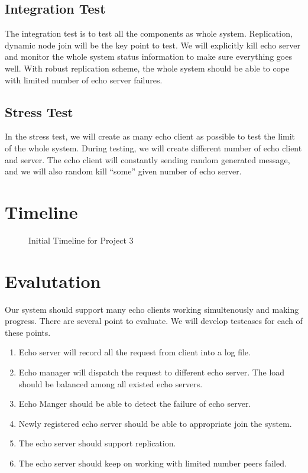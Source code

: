 \documentclass[12pt]{article}
\begin{document}
\subsection{Integration Test}
The integration test is to test all the components as whole system. Replication,
dynamic node join will be the key point to test. We will explicitly kill echo server
and monitor the whole system status information to make sure everything goes well.
With robust replication scheme, the whole system should be able to cope with limited
number of echo server failures.

\subsection{Stress Test}
In the stress test, we will create as many echo client as possible to test
the limit of the whole system. During testing, we will create different number 
of echo client and server. The echo client will constantly sending random 
generated message, and we will also random kill ``some'' given number of echo
server.

\section{Timeline}
\begin{figure}[H]
\caption{Initial Timeline for Project 3}
\label{fig:speciation}
\end{figure}

\section{Evalutation}
Our system should support many echo clients working simultenously and   
making progress. There are several point to evaluate. We will develop testcases
for each of these points.
\begin{enumerate}
  \item Echo server will record all the request from client into a log file. 
  \item Echo manager will dispatch the request to different echo server. The 
    load should be balanced among all existed echo servers.
  \item Echo Manger should be able to detect the failure of echo server.
  \item Newly registered echo server should be able to appropriate join the system.
  \item The echo server should support replication. 
  \item The echo server should keep on working with limited number peers failed.
\end{enumerate}
\end{document}
